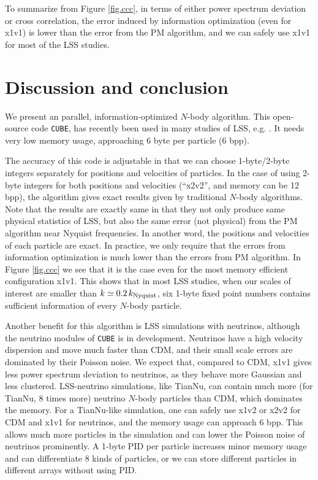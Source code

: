 \documentclass[10pt,twocolumn,preprint]{emulateapj}
\begin{document}
To summarize from Figure \ref{fig.ccc}, in terms of either power spectrum deviation or cross correlation, the error induced by information optimization (even for x1v1) is lower than the error from the PM algorithm, and we can safely use x1v1 for most of the LSS studies.

\section{Discussion and conclusion}\label{s.discussion}
We present an parallel, information-optimized $N$-body algorithm. This open-source code {\tt CUBE}, has recently been used in many studies of LSS, e.g. \cite{2017PhRvD..95d3501Y,2017ApJ...841L..29W,2017MNRAS.469.1968P}. It needs very low memory usage, approaching 6 byte per particle (6 bpp).

The accuracy of this code is adjustable in that we can choose 1-byte/2-byte integers separately for positions and velocities of particles. In the case of using 2-byte integers for both positions and velocities (``x2v2'', and memory can be 12 bpp), the algorithm gives exact results given by traditional $N$-body algorithms. Note that the results are exactly same in that they not only produce same physical statistics of LSS, but also the same error (not physical) from the PM algorithm near Nyquist frequencies. In another word, the positions and velocities of each particle are exact. In practice, we only require that the errors from information optimization is much lower than the errors from PM algorithm. In Figure \ref{fig.ccc} we see that it is the case even for the most memory efficient configuration x1v1. This shows that in most LSS studies, when our scales of interest are smaller than $k\simeq 0.2\,k_{\rm Nyquist}$, six 1-byte fixed point numbers contains sufficient information of every $N$-body particle.

Another benefit for this algorithm is LSS simulations with neutrinos, although the neutrino modules of {\tt CUBE} is in development. Neutrinos have a high velocity dispersion and move much faster than CDM, and their small scale errors are dominated by their Poisson noise. We expect that, compared to CDM, x1v1 gives less power spectrum deviation to neutrinos, as they behave more Gaussian and less clustered. LSS-neutrino simulations, like TianNu, can contain much more (for TianNu, 8 times more) neutrino $N$-body particles than CDM, which dominates the memory. For a TianNu-like simulation, one can safely use x1v2 or x2v2 for CDM and x1v1 for neutrinos, and the memory usage can approach 6 bpp. This allows much more particles in the simulation and can lower the Poisson noise of neutrinos prominently. A 1-byte PID per particle increases minor memory usage and can differentiate 8 kinds of particles, or we can store different particles in different arrays without using PID.
\end{document}
